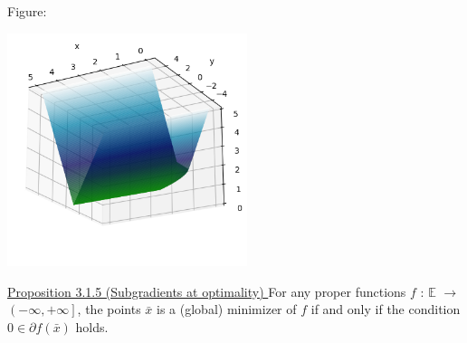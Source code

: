 \documentclass[a4paper,11pt]{jsarticle}
\begin{document}
Figure:

\begin{center}
  \includegraphics[width=7cm]{figures/subgradients_at_optimality.png}
\end{center}

\begin{itembox}[l]{\underline{Proposition 3.1.5 (Subgradients at optimality) }}
  For any proper functions $f$ : $\mathbb{E}$ $\to$ $ \left ( -\infty ,+\infty \right ] $, the points $\bar{x}$ is a (global) minimizer of $f$ if and only if the condition $0 \in \partial f(\bar{x})$ holds.
\end{itembox}
\end{document}
